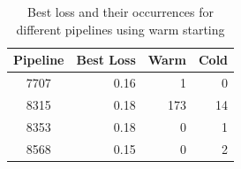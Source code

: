 \begin{table}
\centering
\begin{tabular}{crrr}
\hline
	   Pipeline & Best Loss & Warm & Cold \\ \hline
        7707 & 0.16 & 1 & 0 \\
        8315 & 0.18 & 173 & 14\\
        8353 & 0.18 &0& 1\\ 
        8568 & 0.15 &0&2\\
        \hline
\end{tabular}
\caption{Best loss and their occurrences for different pipelines using warm starting}
\end{table}

%
